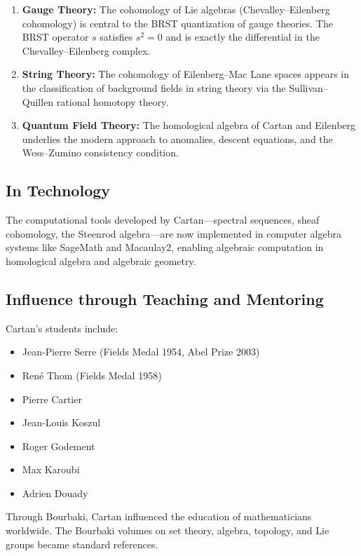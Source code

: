\begin{enumerate}
    \item \textbf{Gauge Theory:} The cohomology of Lie algebras (Chevalley--Eilenberg cohomology) is central to the BRST quantization of gauge theories. The BRST operator $s$ satisfies $s^2 = 0$ and is exactly the differential in the Chevalley--Eilenberg complex.
    \item \textbf{String Theory:} The cohomology of Eilenberg--Mac Lane spaces appears in the classification of background fields in string theory via the Sullivan--Quillen rational homotopy theory.
    \item \textbf{Quantum Field Theory:} The homological algebra of Cartan and Eilenberg underlies the modern approach to anomalies, descent equations, and the Wess--Zumino consistency condition.
\end{enumerate}

\subsection{In Technology}

The computational tools developed by Cartan---spectral sequences, sheaf cohomology, the Steenrod algebra---are now implemented in computer algebra systems like SageMath and Macaulay2, enabling algebraic computation in homological algebra and algebraic geometry.

\subsection{Influence through Teaching and Mentoring}

Cartan's students include:
\begin{itemize}
    \item Jean-Pierre Serre (Fields Medal 1954, Abel Prize 2003)
    \item Ren\'{e} Thom (Fields Medal 1958)
    \item Pierre Cartier
    \item Jean-Louis Koszul
    \item Roger Godement
    \item Max Karoubi
    \item Adrien Douady
\end{itemize}

Through Bourbaki, Cartan influenced the education of mathematicians worldwide. The Bourbaki volumes on set theory, algebra, topology, and Lie groups became standard references.

